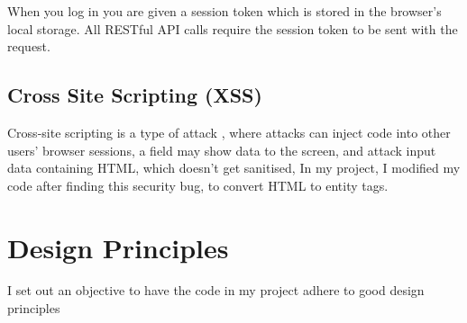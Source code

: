 When you log in you are given a session token which is stored in the browser's local storage.
All RESTful API calls require the session token to be sent with the request.

\subsection{Cross Site Scripting (XSS)}
Cross-site scripting is a type of attack \cite{XSS},
where attacks can inject code into other users' browser sessions,
a field may show data to the screen, and attack input data containing HTML,
which doesn't get sanitised, In my project, I modified my code
after finding this security bug, to convert HTML to entity tags. 

\section {Design Principles}
I set out an objective to have the code in my project
adhere to good design principles
